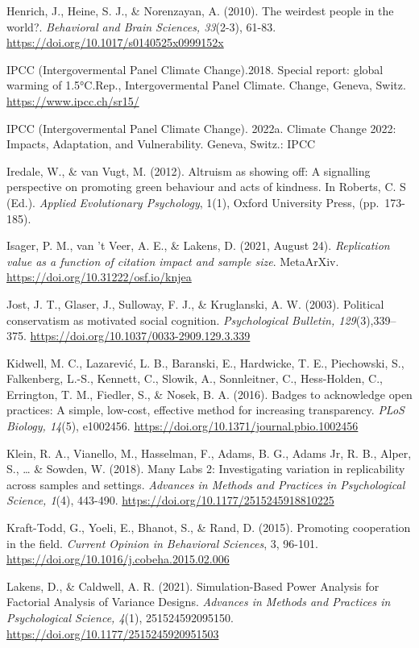 \documentclass[
]{article}
\begin{document}
Henrich, J., Heine, S. J., \& Norenzayan, A. (2010). The weirdest people
in the world?. \emph{Behavioral and Brain Sciences, 33}(2-3), 61-83.
\url{https://doi.org/10.1017/s0140525x0999152x}

IPCC (Intergovermental Panel Climate Change).2018. Special report:
global warming of 1.5°C.Rep., Intergovermental Panel Climate. Change,
Geneva, Switz. \url{https://www.ipcc.ch/sr15/}

IPCC (Intergovermental Panel Climate Change). 2022a. Climate Change
2022: Impacts, Adaptation, and Vulnerability. Geneva, Switz.: IPCC

Iredale, W., \& van Vugt, M. (2012). Altruism as showing off: A
signalling perspective on promoting green behaviour and acts of
kindness. In Roberts, C. S (Ed.). \emph{Applied Evolutionary
Psychology}, 1(1), Oxford University Press, (pp.~173-185).

Isager, P. M., van 't Veer, A. E., \& Lakens, D. (2021, August 24).
\emph{Replication value as a function of citation impact and sample
size}. MetaArXiv. \url{https://doi.org/10.31222/osf.io/knjea}

Jost, J. T., Glaser, J., Sulloway, F. J., \& Kruglanski, A. W. (2003).
Political conservatism as motivated social cognition.
\emph{Psychological Bulletin, 129}(3),339--375.
\url{https://doi.org/10.1037/0033-2909.129.3.339}

Kidwell, M. C., Lazarević, L. B., Baranski, E., Hardwicke, T. E.,
Piechowski, S., Falkenberg, L.-S., Kennett, C., Slowik, A., Sonnleitner,
C., Hess-Holden, C., Errington, T. M., Fiedler, S., \& Nosek, B. A.
(2016). Badges to acknowledge open practices: A simple, low-cost,
effective method for increasing transparency. \emph{PLoS Biology,
14}(5), e1002456. \url{https://doi.org/10.1371/journal.pbio.1002456}

Klein, R. A., Vianello, M., Hasselman, F., Adams, B. G., Adams Jr, R.
B., Alper, S., \ldots{} \& Sowden, W. (2018). Many Labs 2: Investigating
variation in replicability across samples and settings. \emph{Advances
in Methods and Practices in Psychological Science, 1}(4), 443-490.
\url{https://doi.org/10.1177/2515245918810225}

Kraft-Todd, G., Yoeli, E., Bhanot, S., \& Rand, D. (2015). Promoting
cooperation in the field. \emph{Current Opinion in Behavioral Sciences},
3, 96-101. \url{https://doi.org/10.1016/j.cobeha.2015.02.006}

Lakens, D., \& Caldwell, A. R. (2021). Simulation-Based Power Analysis
for Factorial Analysis of Variance Designs. \emph{Advances in Methods
and Practices in Psychological Science, 4}(1), 251524592095150.
\url{https://doi.org/10.1177/2515245920951503}
\end{document}
